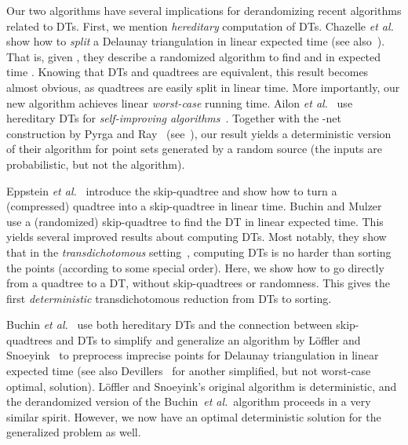 \documentclass[11pt]{paper}
\newcommand {\etal} {\textit {et al.}}
\begin{document}
    Our two algorithms have several implications for derandomizing recent
    algorithms related to DTs. First,
    we mention \emph{hereditary} computation of DTs.
    Chazelle \etal~\cite {ChazelleDeHuMoSaTe02} show how to \emph{split} a Delaunay
    triangulation in linear expected time (see also~\cite{ChazelleMu11}).
    That is, given ,
    they describe a randomized algorithm to find  and
     in expected time . Knowing that DTs
    and quadtrees are equivalent, this result becomes almost obvious, as quadtrees
    are easily split in linear time. More importantly, our
    new algorithm achieves linear \emph{worst-case} running time.
Ailon \etal~\cite{AilonChClLiMuSe11} use hereditary
    DTs for 
    \emph{self-improving algorithms}~\cite{AilonChClLiMuSe11}.
    Together with the -net construction by Pyrga and Ray~\cite{PyrgaRa08}
    (see~\cite[Appendix~A]{AilonChClLiMuSe11}),
    our result yields a deterministic version of their algorithm for
    point sets generated by a random source (the inputs are probabilistic,
    but not the algorithm).

    Eppstein \etal~\cite {EppsteinGoSu08} introduce the skip-quadtree and show
    how to turn a (compressed) quadtree into a skip-quadtree in linear
    time.  Buchin and Mulzer~\cite{BuchinMu11} use a
    (randomized) skip-quadtree to find the DT in linear
    expected time.
    This yields several improved results
    about computing DTs. Most notably, they show
    that in the \emph{transdichotomous} 
    setting~\cite{ChanPa09,ChanPa10,FredmanWi94}, computing DTs
    is no harder than sorting the points (according to some special order).
    Here, we show how to go directly from a quadtree
    to a DT, without skip-quadtrees or randomness.
    This gives the first \emph{deterministic} transdichotomous reduction from
    DTs to sorting.

    Buchin \etal~\cite {BuchinLoMoMuXX} use both hereditary
    DTs and the connection between skip-quadtrees and DTs
    to simplify and generalize
    an algorithm by L{\"o}ffler and Snoeyink~\cite{LoefflerSn10}
    to preprocess imprecise points for Delaunay triangulation
    in linear expected time (see also Devillers~\cite{Devillers11} for another
    simplified, but not worst-case optimal, solution). L{\"o}ffler and Snoeyink's
    original algorithm is deterministic, and the derandomized version of the
    Buchin~\etal~algorithm proceeds in a very similar spirit. However, we
    now have an optimal deterministic solution for the generalized 
    problem as well.
\end{document}

